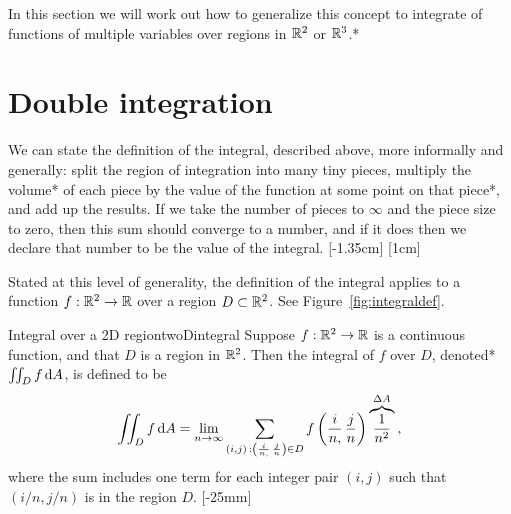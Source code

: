 \documentclass{watsonbook}
\begin{document}
  In this section we will work out how to generalize this concept
  to integrate of functions of multiple variables over regions in
  $\mathbb{R}^2$ or $\mathbb{R}^3$.* 
  
  \section{Double integration} \label{sec:double}

  
  We can state the definition of the integral, described above, more
  informally and generally: split the region of integration into many
  tiny pieces, multiply the volume* of each piece by the value of the
  function at some point on that piece*, and add up the results. If we
  take the number of pieces to $\infty$ and the piece size to zero,
  then this sum should converge to a number, and if it does then we
  declare that number to be the value of the integral.
  [-1.35cm] [1cm]
  
  Stated at this level of generality, the definition of the integral
  applies to a function $f: \mathbb{R}^2 \to \mathbb{R}$ over a region $D
  \subset \mathbb{R}^2$. See Figure~\ref{fig:integraldef}. 
  \begin{defn}{Integral over a 2D region}{twoDintegral}
    Suppose $f: \mathbb{R}^2 \to \mathbb{R}$ is a continuous function, and that $D$ is a region in
    $\mathbb{R}^2$. Then the integral of $f$ over $D$, denoted*
    $\iint_D f \, \mathrm{d} A$, is defined to be
    \begin{equation} \label{eq:def2D}
      \iint_D f \, \mathrm{d} A = \lim_{n\to\infty} \sum_{(i,j) \, : \left(\frac{i}{n,} \,\frac{j}{n}\right) \in D}
      f\left(\frac{i}{n,}\,\frac{j}{n}\right)
      \overbrace{\frac{1}{n^2}}^{\Delta A} \:,  
    \end{equation}
    where the sum includes one term for each integer pair $(i,j)$ such
    that $(i/n,j/n)$ is in the region $D$.   [-25mm]
  \end{defn}
\end{document}

